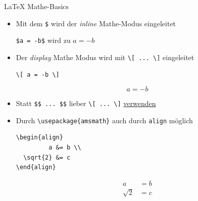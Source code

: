 \documentclass[main.tex]{subfiles}
\begin{document}
\begin{frame}[fragile]{\LaTeX{} Mathe-Basics}
    \begin{itemize}
        \item Mit dem \texttt{\$} wird der \textit{inline} Mathe-Modus eingeleitet
        \pause
        \begin{center}
            \verb|$a = -b$| wird zu $a=-b$
        \end{center}
        \pause
        \item Der \textit{display} Mathe Modus wird mit \verb|\[ ... \]| eingeleitet
        \vspace{-7pt}
        \begin{center}
            \begin{minipage}[t][][b]{0.35\textwidth}
                \begin{verbatim}
\[ a = -b \]
                \end{verbatim}
            \end{minipage}
            \begin{minipage}[t][][b]{0.35\textwidth}
                \vspace{-9pt}\[a = -b\]
            \end{minipage}
        \end{center}
        \vspace{-7pt}
        \pause
        \item Statt \verb|$$ ... $$| lieber \verb|\[ ... \]| \href{https://tex.stackexchange.com/a/69854}{verwenden}
        \pause
        \medskip
        \item Durch \verb|\usepackage{amsmath}| auch durch \texttt{align} möglich
        \pause
        \vspace{-7pt}
        \begin{center}
            \begin{minipage}[t][][b]{0.35\textwidth}
                \begin{verbatim}
\begin{align}
         a &= b \\
  \sqrt{2} &= c
\end{align}
                \end{verbatim}
            \end{minipage}
            \begin{minipage}[t][][b]{0.35\textwidth}
                \vspace{-6pt}
                \begin{align}
                    a        & = b \\
                    \sqrt{2} & = c
                \end{align}
            \end{minipage}
        \end{center}
        \vspace{-7pt}
    \end{itemize}
\end{frame}
\end{document}
